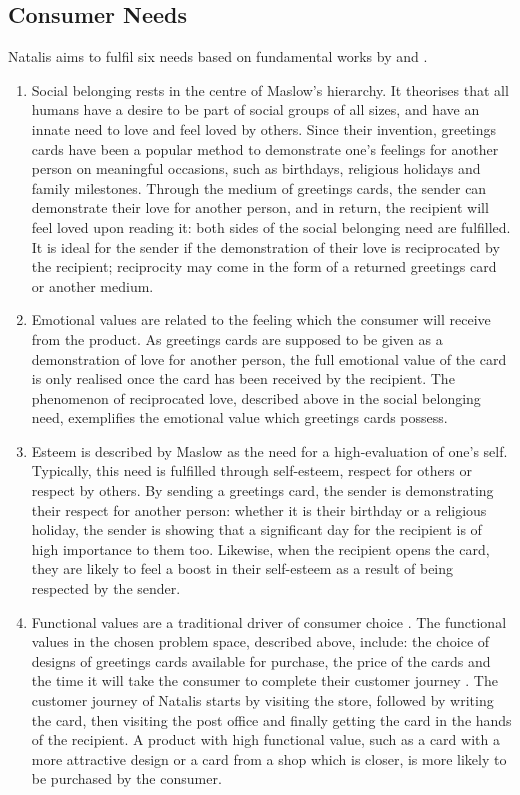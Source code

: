 \documentclass[10pt, a4paper]{article}
\begin{document}
\subsection*{Consumer Needs}
\label{sec:consumer_needs}
Natalis aims to fulfil six needs based on fundamental works by \citet{maslow1943theory} and \citet{sheth1991we}.
\begin{enumerate}
  \item Social belonging rests in the centre of Maslow’s hierarchy. It theorises that all humans have a desire to be part of social groups of all sizes, and have an innate need to love and feel loved by others. Since their invention, greetings cards have been a popular method to demonstrate one’s feelings for another person on meaningful occasions, such as birthdays, religious holidays and family milestones. Through the medium of greetings cards, the sender can demonstrate their love for another person, and in return, the recipient will feel loved upon reading it: both sides of the social belonging need are fulfilled. It is ideal for the sender if the demonstration of their love is reciprocated by the recipient; reciprocity may come in the form of a returned greetings card or another medium.
  \item Emotional values are related to the feeling which the consumer will receive from the product. As greetings cards are supposed to be given as a demonstration of love for another person, the full emotional value of the card is only realised once the card has been received by the recipient. The phenomenon of reciprocated love, described above in the social belonging need, exemplifies the emotional value which greetings cards possess.
  \item Esteem is described by Maslow \citep{maslow1943theory} as the need for a high-evaluation of one’s self. Typically, this need is fulfilled through self-esteem, respect for others or respect by others. By sending a greetings card, the sender is demonstrating their respect for another person: whether it is their birthday or a religious holiday, the sender is showing that a significant day for the recipient is of high importance to them too. Likewise, when the recipient opens the card, they are likely to feel a boost in their self-esteem as a result of being respected by the sender.
  \item Functional values are a traditional driver of consumer choice \citep{sheth1991we}. The functional values in the chosen problem space, described above, include: the choice of designs of greetings cards available for purchase, the price of the cards and the time it will take the consumer to complete their customer journey \citep{edelman2015competing}. The customer journey of Natalis starts by visiting the store, followed by writing the card, then visiting the post office and finally getting the card in the hands of the recipient. A product with high functional value, such as a card with a more attractive design or a card from a shop which is closer, is more likely to be purchased by the consumer.

\end{enumerate}
\end{document}
